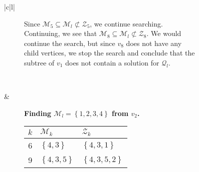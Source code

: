 \begin{figure}[H]
\begin{tabular}[t]{|c|l|}
\begin{subfigure}[b]{0.64\textwidth}
        Since $\mathcal{M}_5 \subseteq \mathcal{M}_l \not \subset
        \mathcal{Z}_5$, we continue searching. Continuing, we see that
        $\mathcal{M}_8 \subseteq \mathcal{M}_l \not \subset \mathcal{Z}_8$.
        We would continue the search, but since $v_8$ does not have any child
        vertices, we stop the search and conclude that the subtree of $v_1$
        does not contain a solution for $\mathcal{Q}_l$.
        \\
    \end{subfigure}
    \\ \hline
    \begin{subfigure}[b]{0.35\textwidth}
        \centering
        
    \end{subfigure}
    & 
    \begin{subfigure}[b]{0.64\textwidth}
        \textbf{Finding $\mathcal{M}_l = \left\{{1,2,3,4}\right\}$ from $v_2$.} \\
        \begin{tabular}{rll}
            $k$ & $\mathcal{M}_k$            & $\mathcal{Z}_k$ \\ \hline
            6        & $\left\{{4,3}\right\}$     & $\left\{{4,3,1}\right\}$ \\ 
            9        & $\left\{{4,3,5}\right\}$   & $\left\{{4,3,5,2}\right\}$ \\ 
        \end{tabular}


\end{subfigure}
\end{tabular}
\end{figure}

